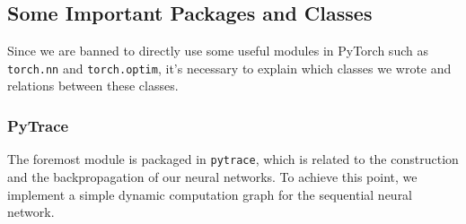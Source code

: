 \documentclass[12pt]{article}
\begin{document}
\subsection{Some Important Packages and Classes}
Since we are banned to directly use some useful modules in PyTorch such as \texttt{torch.nn} and \texttt{torch.optim}, it's necessary to explain which classes we wrote and relations between these classes.

\subsubsection{PyTrace}
The foremost module is packaged in \texttt{pytrace}, which is related to the construction and the backpropagation of our neural networks. To achieve this point, we implement a simple dynamic computation graph for the sequential neural network. 
\end{document}
